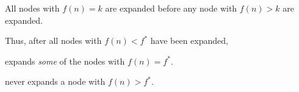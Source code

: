 


All nodes with $f(n) = k$ are expanded before any node with $f(n) > k$ are expanded.

Thus, after all nodes with $f(n) < f^*$ have been expanded, 

\astar expands \emph{some} of the nodes with $f(n) = f^*$.

\astar never expands a node with $f(n) > f^*$.



